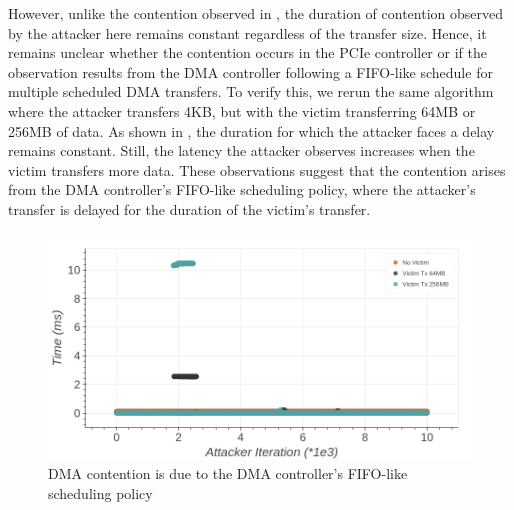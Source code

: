 \vspace{1em}
However, unlike the contention observed in , the duration of contention observed by the attacker here remains constant regardless of the transfer size.
Hence, it remains unclear whether the contention occurs in the PCIe controller or if the observation results from the DMA controller following a FIFO-like schedule for multiple scheduled DMA transfers.
To verify this, we rerun the same algorithm where the attacker transfers 4KB, but with the victim transferring 64MB or 256MB of data.
As shown in , the duration for which the attacker faces a delay remains constant.
Still, the latency the attacker observes increases when the victim transfers more data.
These observations suggest that the contention arises from the DMA controller's FIFO-like scheduling policy, where the attacker's transfer is delayed for the duration of the victim's transfer.

\begin{figure}[!htb]
    \centering
    \includegraphics[width=\textwidth]{figures/interconnect-sc/dma/dma_contention_fifo.png}
    \caption{DMA contention is due to the DMA controller's FIFO-like scheduling policy}
    \label{fig:dma-contention-fifo}
\end{figure}